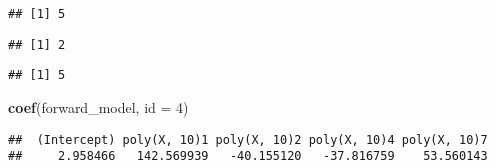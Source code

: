 \documentclass[
]{article}
\newenvironment{Shaded}{\begin{snugshade}}{\end{snugshade}}
\newcommand{\CommentTok}[1]{\textcolor[rgb]{0.56,0.35,0.01}{\textit{#1}}}
\newcommand{\DataTypeTok}[1]{\textcolor[rgb]{0.13,0.29,0.53}{#1}}
\newcommand{\DecValTok}[1]{\textcolor[rgb]{0.00,0.00,0.81}{#1}}
\newcommand{\KeywordTok}[1]{\textcolor[rgb]{0.13,0.29,0.53}{\textbf{#1}}}
\newcommand{\NormalTok}[1]{#1}
\newcommand{\OperatorTok}[1]{\textcolor[rgb]{0.81,0.36,0.00}{\textbf{#1}}}
\newcommand{\StringTok}[1]{\textcolor[rgb]{0.31,0.60,0.02}{#1}}
\begin{document}
\begin{verbatim}
## [1] 5
\end{verbatim}

\begin{Shaded}
\end{Shaded}

\begin{verbatim}
## [1] 2
\end{verbatim}

\begin{Shaded}
\end{Shaded}

\begin{verbatim}
## [1] 5
\end{verbatim}

\begin{Shaded}
\begin{Highlighting}[]
\KeywordTok{coef}\NormalTok{(forward_model, }\DataTypeTok{id =} \DecValTok{4}\NormalTok{)}
\end{Highlighting}
\end{Shaded}

\begin{verbatim}
##  (Intercept) poly(X, 10)1 poly(X, 10)2 poly(X, 10)4 poly(X, 10)7 
##     2.958466   142.569939   -40.155120   -37.816759    53.560143
\end{verbatim}

\begin{Shaded}
\end{Shaded}
\end{document}
